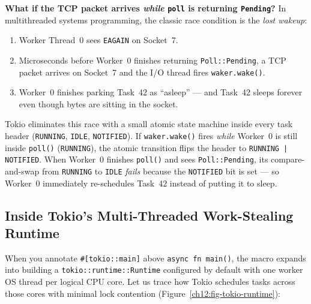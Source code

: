 \begin{trapbox}
\textbf{What if the TCP packet arrives \emph{while} \texttt{poll} is returning \texttt{Pending}?} In multithreaded systems programming, the classic race condition is the \emph{lost wakeup}:
\begin{enumerate}
  \item Worker Thread~0 sees \texttt{EAGAIN} on Socket~7.
  \item Microseconds before Worker~0 finishes returning \texttt{Poll::Pending}, a TCP packet arrives on Socket~7 and the I/O thread fires \texttt{waker.wake()}.
  \item Worker~0 finishes parking Task~42 as ``asleep'' --- and Task~42 sleeps forever even though bytes are sitting in the socket.
\end{enumerate}
Tokio eliminates this race with a small atomic state machine inside every task header (\texttt{RUNNING}, \texttt{IDLE}, \texttt{NOTIFIED}). If \texttt{waker.wake()} fires \emph{while} Worker~0 is still inside \texttt{poll()} (\texttt{RUNNING}), the atomic transition flips the header to \texttt{RUNNING | NOTIFIED}. When Worker~0 finishes \texttt{poll()} and sees \texttt{Poll::Pending}, its compare-and-swap from \texttt{RUNNING} to \texttt{IDLE} \emph{fails} because the \texttt{NOTIFIED} bit is set --- so Worker~0 immediately re-schedules Task~42 instead of putting it to sleep.
\end{trapbox}

\subsection{Inside Tokio's Multi-Threaded Work-Stealing Runtime}

When you annotate \texttt{\#[tokio::main]} above \texttt{async fn main()}, the macro expands into building a \texttt{tokio::runtime::Runtime} configured by default with one worker OS thread per logical CPU core. Let us trace how Tokio schedules tasks across those cores with minimal lock contention (Figure~\ref{ch12:fig-tokio-runtime}):

